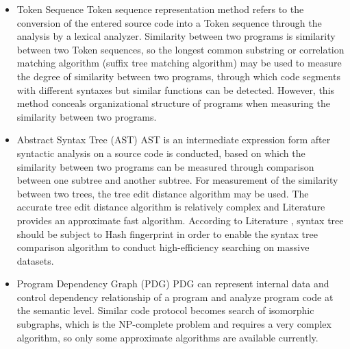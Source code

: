 \begin{itemize}

	\item Token Sequence
	Token sequence representation method refers to the conversion of the entered source code into a Token sequence through the analysis by a lexical analyzer. Similarity between two programs is similarity between two Token sequences, so the longest common substring or correlation matching algorithm (suffix tree matching algorithm) may be used to measure the degree of similarity between two programs, through which code segments with different syntaxes but similar functions can be detected. However, this method conceals organizational structure of programs when measuring the similarity between two programs.

	\item Abstract Syntax Tree (AST)
	AST is an intermediate expression form after syntactic analysis on a source code is conducted, based on which the similarity between two programs can be measured through comparison between one subtree and another subtree. For measurement of the similarity between two trees, the tree edit distance algorithm \cite{zhang1989simple} may be used. The accurate tree edit distance algorithm is relatively complex and Literature \cite{guha2002approximate} provides an approximate fast algorithm. According to Literature \cite{chilowicz2009syntax}, syntax tree should be subject to Hash fingerprint in order to enable the syntax tree comparison algorithm to conduct high-efficiency searching on massive datasets. 
	

	\item Program Dependency Graph (PDG)
	PDG \cite{ferrante1987program} can represent internal data and control dependency relationship of a program and analyze program code at the semantic level. Similar code protocol becomes search of isomorphic subgraphs, which is the NP-complete problem and requires a very complex algorithm, so only some approximate algorithms are available currently.


\end{itemize}

